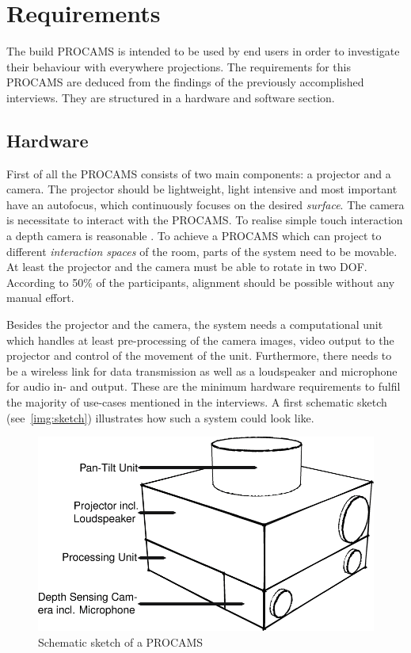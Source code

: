 \chapter{Requirements}\label{chapter:requirements}
The build \ac{PROCAMS} is intended to be used by end users in order to investigate their behaviour with everywhere projections. The requirements for this \ac{PROCAMS} are deduced from the findings of the previously accomplished interviews. They are structured in a hardware and software section.

\section{Hardware}
First of all the \ac{PROCAMS} consists of two main components: a projector and a camera. The projector should be lightweight, light intensive and most important have an autofocus, which continuously focuses on the desired \emph{surface}. The camera is necessitate to interact with the \ac{PROCAMS}. To realise simple touch interaction a depth camera is reasonable \cite{Wilson:2010bv,Klompmaker:2012id}.
To achieve a \ac{PROCAMS} which can project to different \emph{interaction spaces} of the room, parts of the system need to be movable. At least the projector and the camera must be able to rotate in two \acl{DOF}. According to 50\% of the participants, alignment  should be possible without any manual effort.


Besides the projector and the camera, the system needs a computational unit which handles at least pre-processing of the camera images, video output to the projector and control of the movement of the unit. Furthermore, there needs to be a wireless link for data transmission as well as a loudspeaker and microphone for audio in- and output. These are the minimum hardware requirements to fulfil the majority of use-cases mentioned in the interviews. A first schematic sketch (see~\autoref{img:sketch}) illustrates how such a system could look like.

\begin{figure}[htbp] 
   \centering
   \includegraphics[width=\textwidth]{images/requirements/sketch_3.pdf} 
   \caption{Schematic sketch of a \ac{PROCAMS}}
   \label{img:sketch}
\end{figure}

